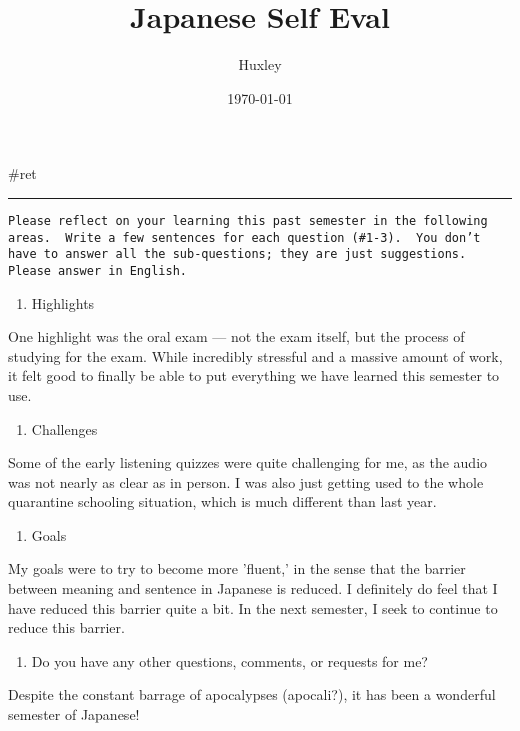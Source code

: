 \documentclass[letterpaper]{article}
\author{Huxley}
\date{\today}
\title{Japanese Self Eval}
\renewcommand\maketitle{}
\begin{document}
\maketitle
\#ret

\noindent\rule{\textwidth}{0.5pt}

\begin{verbatim}
Please reflect on your learning this past semester in the following areas.  Write a few sentences for each question (#1-3).  You don’t have to answer all the sub-questions; they are just suggestions.  Please answer in English.
\end{verbatim}

\begin{enumerate}
\item Highlights
\end{enumerate}

One highlight was the oral exam --- not the exam itself, but the process
of studying for the exam. While incredibly stressful and a massive
amount of work, it felt good to finally be able to put everything we
have learned this semester to use.

\begin{enumerate}
\item Challenges
\end{enumerate}

Some of the early listening quizzes were quite challenging for me, as
the audio was not nearly as clear as in person. I was also just getting
used to the whole quarantine schooling situation, which is much
different than last year.

\begin{enumerate}
\item Goals
\end{enumerate}

My goals were to try to become more 'fluent,' in the sense that the
barrier between meaning and sentence in Japanese is reduced. I
definitely do feel that I have reduced this barrier quite a bit. In the
next semester, I seek to continue to reduce this barrier.

\begin{enumerate}
\item Do you have any other questions, comments, or requests for me?
\end{enumerate}

Despite the constant barrage of apocalypses (apocali?), it has been a
wonderful semester of Japanese!
\end{document}
